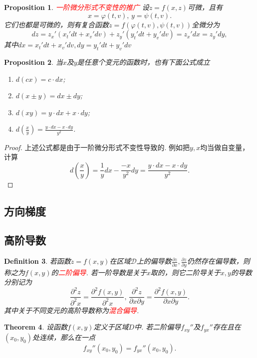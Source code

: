 \documentclass{article}
\newtheorem{theorem}{Theorem}[section]
\newtheorem{proposition}[theorem]{Proposition}
\newtheorem{definition}[theorem]{Definition}
\newcommand{\redt}[1]{\textcolor{red}{#1}}
\begin{document}
\begin{proposition}
\rm \redt{一阶微分形式不变性的推广} 设$z= f(x,z)$可微，且有
$$
x = \varphi(t,v),\, y = \psi(t,v).
$$
它们也都是可微的，则有复合函数$z=f(\varphi(t,v),\psi(t,v))$全微分为
$$
dz= z_x'(x_t'dt + x_v'dv) + z_y'(y_t'dt+y_v'dv) = z_x'dx = z_y'dy, 
$$
其中$dx = x_t'dt + x_v'dv,dy = y_t'dt+y_v'dv$
\end{proposition}

\begin{proposition}
\rm 当$x$及$y$是任意个变元的函数时，也有下面公式成立
\begin{enumerate}
	\item $d(cx)=c\cdot dx$;
	\item $d(x\pm y)=dx \pm dy$;
	\item $d(xy) = y\cdot dx + x\cdot dy$;
	\item $d(\frac{x}{y}) = \frac{y\cdot dx - x\cdot dy}{y^2}$.
\end{enumerate}
\end{proposition}

\begin{proof}
上述公式都是由于一阶微分形式不变性导致的. 例如把$y,x$均当做自变量，计算
$$
d(\frac{x}{y}) = \frac{1}{y}dx - \frac{-x}{y^2}dy = \frac{y\cdot dx - x\cdot dy}{y^2}.
$$
\end{proof}


\subsection{方向梯度}

\subsection{高阶导数}

\begin{definition}
\rm 若函数$z=f(x,y)$在区域$\mathcal{D}$上的偏导数$\frac{\partial z}{\partial x},\frac{\partial z}{\partial y}$仍然存在偏导数，则称之为$f(x,y)$的\redt{二阶偏导}. 若一阶导数是关于$x$取的，则它二阶导关于$x,y$的导数分别记为
$$
\frac{\partial^2z}{\partial^2 x} = \frac{\partial^2 f(x,y)}{\partial^2 x},\, \frac{\partial^2z}{\partial x \partial y} = \frac{\partial^2 f(x,y)}{\partial x \partial y}.  
$$
其中关于不同变元的高阶导数称为\redt{混合偏导}.
\end{definition}

\begin{theorem}\label{mixed-derivatives: exchange-order}
\rm 设函数$f(x,y)$定义于区域$D$中. 若二阶偏导$f_{xy}''$及$f_{yx}''$存在且在$(x_0,y_0)$处连续，那么在一点
$$
f_{xy}''(x_0,y_0) = f_{yx}''(x_0,y_0).
$$
\end{theorem}
\end{document}
